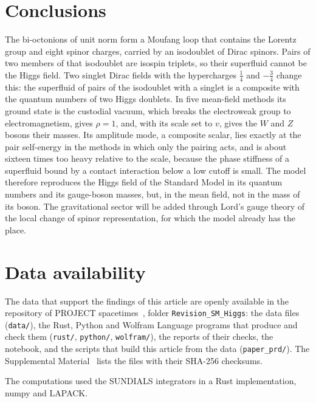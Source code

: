 \documentclass[aps,prd,twocolumn,superscriptaddress,nofootinbib,floatfix,longbibliography]{revtex4-2}
\begin{document}
\section{Conclusions}
\label{sec:conclusions}

The bi-octonions of unit norm form a Moufang loop that contains the Lorentz group and eight spinor charges, carried by
an isodoublet of Dirac spinors. Pairs of two members of that isodoublet are isospin triplets, so their superfluid cannot
be the Higgs field. Two singlet Dirac fields with the hypercharges $\frac14$ and $-\frac34$ change this: the superfluid of
pairs of the isodoublet with a singlet is a composite with the quantum numbers of two Higgs doublets. In five mean-field
methods its ground state is the custodial vacuum, which breaks the electroweak group to electromagnetism, gives $\rho=1$,
and, with its scale set to $v$, gives the $W$ and $Z$ bosons their masses. Its amplitude mode, a composite scalar, lies
exactly at the pair self-energy in the methods in which only the pairing acts, and is about sixteen times too heavy
relative to the scale, because the phase stiffness of a superfluid bound by a contact interaction below a low cutoff is
small. The model therefore reproduces the Higgs field of the Standard Model in its quantum numbers and its gauge-boson
masses, but, in the mean field, not in the mass of its boson. The gravitational sector will be added through Lord's gauge
theory of the local change of spinor representation, for which the model already has the place.

\section*{Data availability}

The data that support the findings of this article are openly available in the repository of PROJECT
spacetimes~\cite{Repo}, folder \texttt{Revision\_SM\_Higgs}: the data files (\texttt{data/}), the Rust, Python and Wolfram
Language programs that produce and check them (\texttt{rust/}, \texttt{python/}, \texttt{wolfram/}), the reports of their
checks, the notebook, and the scripts that build this article from the data (\texttt{paper\_prd/}). The Supplemental
Material~\cite{SM} lists the files with their SHA-256 checksums.

\begin{acknowledgments}
The computations used the SUNDIALS integrators in a Rust implementation, numpy and LAPACK.
\end{acknowledgments}


\end{document}
